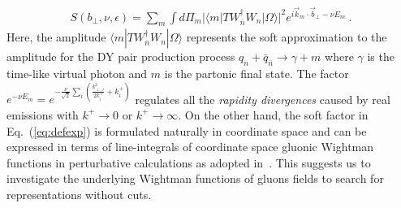 \documentclass[a4paper,11pt]{article}
\begin{document}
\begin{align}\label{eq:cutrepre}
S(b_\perp,\nu,\epsilon)=\sum_{m}\int d\Pi_m |\langle m| T W_{\bar n}^{\dagger}W_n|\Omega\rangle|^2e^{i\vec{k}_m\cdot \vec{b}_\perp-\nu E_m } \ .
\end{align}
Here, the amplitude $\langle m| T W_{\bar n}^{\dagger}W_n|\Omega\rangle $ represents the soft approximation to the amplitude for the DY pair production process $q_n+\bar q_{\bar n}\rightarrow \gamma+m$ where $\gamma$ is the time-like virtual photon and $m$ is the partonic final state. The factor $e^{-\nu E_m}=e^{-\frac{\nu}{\sqrt{2}}\sum_{i}\left(\frac{k_{\perp,i}^2}{2k^+_i}+k_i^+\right)}$ regulates all the {\it rapidity divergences} caused by real emissions with $k^+\rightarrow 0$ or $k^+ \rightarrow \infty$. On the other hand, the soft factor in Eq.~(\ref{eq:defexp}) is formulated naturally in coordinate space and can be expressed in terms of line-integrals of coordinate space gluonic Wightman functions in perturbative calculations as adopted in~\cite{Korchemskaya:1992je,Korchemsky:1992xv}. This suggests us to investigate the underlying Wightman functions of gluons fields to search for representations without cuts.
\end{document}

